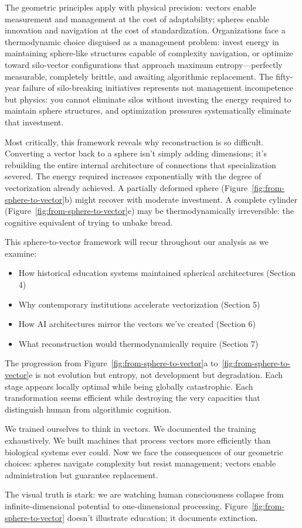 The geometric principles apply with physical precision: vectors enable measurement and management at the cost of adaptability; spheres enable innovation and navigation at the cost of standardization. Organizations face a thermodynamic choice disguised as a management problem: invest energy in maintaining sphere-like structures capable of complexity navigation, or optimize toward silo-vector configurations that approach maximum entropy—perfectly measurable, completely brittle, and awaiting algorithmic replacement. The fifty-year failure of silo-breaking initiatives \citep{ashkenas2015} represents not management incompetence but physics: you cannot eliminate silos without investing the energy required to maintain sphere structures, and optimization pressures systematically eliminate that investment.

Most critically, this framework reveals why reconstruction is so difficult. Converting a vector back to a sphere isn't simply adding dimensions; it's rebuilding the entire internal architecture of connections that specialization severed. The energy required increases exponentially with the degree of vectorization already achieved. A partially deformed sphere (Figure~\ref{fig:from-sphere-to-vector}b) might recover with moderate investment. A complete cylinder (Figure~\ref{fig:from-sphere-to-vector}e) may be thermodynamically irreversible: the cognitive equivalent of trying to unbake bread.

This sphere-to-vector framework will recur throughout our analysis as we examine:
\begin{itemize}
\item How historical education systems maintained spherical architectures (Section 4)
\item Why contemporary institutions accelerate vectorization (Section 5)
\item How AI architectures mirror the vectors we've created (Section 6)
\item What reconstruction would thermodynamically require (Section 7)
\end{itemize}

The progression from Figure~\ref{fig:from-sphere-to-vector}a to~\ref{fig:from-sphere-to-vector}e is not evolution but entropy, not development but degradation. Each stage appears locally optimal while being globally catastrophic. Each transformation seems efficient while destroying the very capacities that distinguish human from algorithmic cognition.

We trained ourselves to think in vectors. We documented the training exhaustively. We built machines that process vectors more efficiently than biological systems ever could. Now we face the consequences of our geometric choices: spheres navigate complexity but resist management; vectors enable administration but guarantee replacement.

The visual truth is stark: we are watching human consciousness collapse from infinite-dimensional potential to one-dimensional processing. Figure~\ref{fig:from-sphere-to-vector} doesn't illustrate education; it documents extinction.